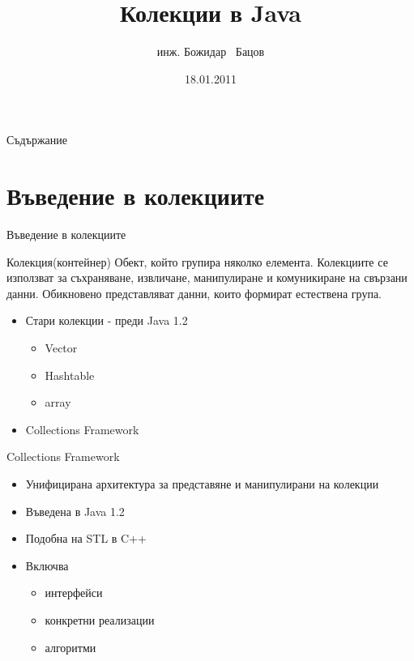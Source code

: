 \documentclass{beamer}
\title{Колекции в Java}
\author{инж. Божидар ~Бацов}
\institute{Drow Ltd.}
\date{18.01.2011}
\begin{document}
\begin{frame}
  \titlepage
\end{frame}

\begin{frame}{Съдържание}
  \tableofcontents[pausesections]
\end{frame}

\section{Въведение в колекциите}

\begin{frame}{Въведение в колекциите}
  \begin{block}{Колекция(контейнер)}
    Обект, който групира няколко елемента. Колекциите се използват за
    съхраняване, извличане, манипулиране и комуникиране на свързани
    данни. Обикновено представляват данни, които формират естествена група.
  \end{block}
  \begin{itemize}
  \item
    Стари колекции - преди Java 1.2
    \begin{itemize}
      \item Vector
      \item Hashtable
      \item array
    \end{itemize}
  \item Collections Framework
  \end{itemize}
\end{frame}

\begin{frame}{Collections Framework}
  \transdissolve
  \begin{itemize}
  \item  Унифицирана архитектура за представяне и манипулирани на
    колекции    
   \item Въведена в Java 1.2
  \item Подобна на STL в C++
  \item Включва
    \begin{itemize}
    \item интерфейси
    \item конкретни реализации
    \item алгоритми
    \end{itemize}
  \end{itemize}
\end{frame}
\end{document}
